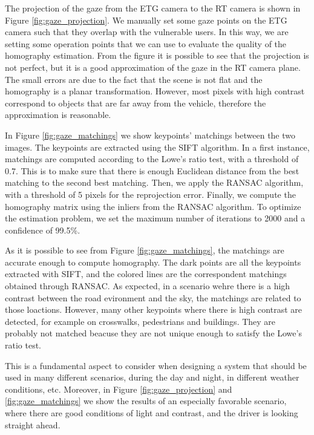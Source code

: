 The projection of the gaze from the ETG camera to the RT camera is shown in 
Figure \ref{fig:gaze_projection}. We manually set some gaze points on the 
ETG camera such that they overlap with the vulnerable users. In this way, 
we are setting some operation points that we can use to evaluate the quality 
of the homography estimation. From the figure it is possible to see that the 
projection is not perfect, but it is a good approximation of the gaze in the 
RT camera plane. The small errors are due to the fact that the scene is not 
flat and the homography is a planar transformation. However, most pixels with 
high contrast correspond to objects that are far away from the vehicle, 
therefore the approximation is reasonable.

In Figure \ref{fig:gaze_matchings} we show keypoints' matchings between the 
two images. The keypoints are extracted using the SIFT algorithm.
In a first instance, matchings are computed according to the Lowe's ratio test, 
with a threshold of 0.7. This is to make sure that there is enough Euclidean 
distance from the best matching to the second best matching. Then, we apply 
the RANSAC algorithm, with a threshold of 5 pixels for the reprojection error.
Finally, we compute the homography matrix using the inliers from the RANSAC 
algorithm. To optimize the estimation problem, we set the maximum number of 
iterations to 2000 and a confidence of 99.5\%.

As it is possible to see from Figure \ref{fig:gaze_matchings}, the matchings 
are accurate enough to compute homography. The dark points are all the keypoints 
extracted with SIFT, and the colored lines are the correspondent matchings 
obtained through RANSAC. 
As expected, in a scenario wehre there is a high contrast between the road 
evironment and the sky, the matchings are related to those loactions. 
However, many other keypoints where there is high contrast are detected, for 
example on crosswalks, pedestrians and buildings. They are probably not matched 
beacuse they are not unique enough to satisfy the Lowe's ratio test.

This is a fundamental aspect to consider when designing a system that should be 
used in many different scenarios, during the day and night, in different weather 
conditions, etc. Moreover, in Figure \ref{fig:gaze_projection} and 
\ref{fig:gaze_matchings} we show the results of an especially favorable scenario, 
where there are good conditions of light and contrast, and the driver is looking 
straight ahead.

